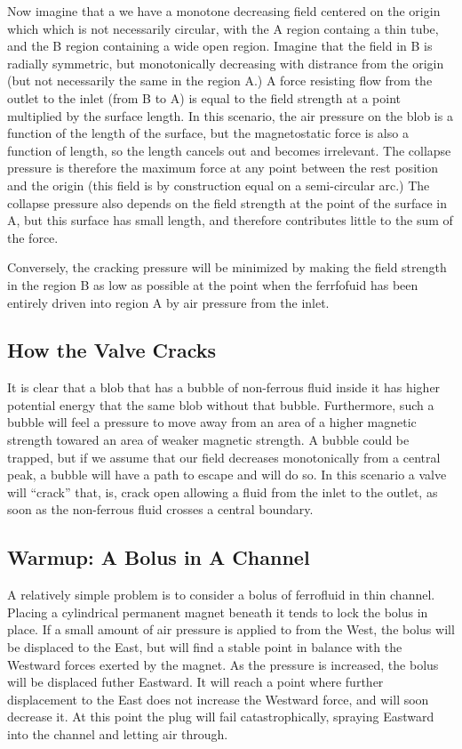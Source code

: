 \documentclass[]{asme2ej}
\begin{document}
Now imagine that a we have a monotone decreasing field centered
on the origin which which is not necessarily circular, with
the A region containg a thin tube, and the B region containing
a wide open region. Imagine that the field in B is radially
symmetric, but monotonically decreasing with distrance from
the origin (but not necessarily the same in the region A.)
A force resisting flow from the outlet to the inlet (from B to A)
is equal to the field strength at a point multiplied by the surface
length.
In this scenario, the air pressure on the blob is a function
of the length of the surface, but the magnetostatic force is
also a function of length, so the length cancels out and becomes
irrelevant.
The collapse pressure is therefore the maximum force at any point between the rest position and the origin
(this field is by construction equal on a semi-circular arc.)
The collapse pressure also depends on the field strength
at the point of the surface in A, but this surface has small length,
and therefore contributes little to the sum of the force.

Conversely, the cracking pressure will be minimized by
making the field strength in the region B as low as possible
at the point when the ferrfofuid has been entirely driven into
region A by air pressure from the inlet.

\subsection{How the Valve Cracks}

It is clear that a blob that has a bubble of non-ferrous fluid inside it
has higher potential energy that the same blob without that bubble.
Furthermore, such a bubble will feel a pressure to move away from
an area of a higher magnetic strength towared an area of weaker magnetic
strength. A bubble could be trapped, but if we assume that our
field decreases monotonically from a central peak, a bubble
will have a path to escape and will do so.
In this scenario a valve will ``crack'' that, is, crack open
allowing a fluid from the inlet to the outlet, as soon as the
non-ferrous fluid crosses a central boundary.

\subsection{Warmup: A Bolus in A Channel}

A relatively simple problem is to consider a bolus of
ferrofluid in thin channel. Placing a cylindrical permanent
magnet beneath it tends to lock the bolus in place.
If a small amount of air pressure is applied to from the West, the bolus will
be displaced to the East, but will find a stable point in balance with the
Westward forces exerted by the magnet.
As the pressure is increased, the bolus will be displaced futher Eastward.
It will reach a point where further displacement to the East does not increase
the Westward force, and will soon decrease it. At this point the plug will fail
catastrophically, spraying Eastward into the channel and letting air through.
\end{document}
